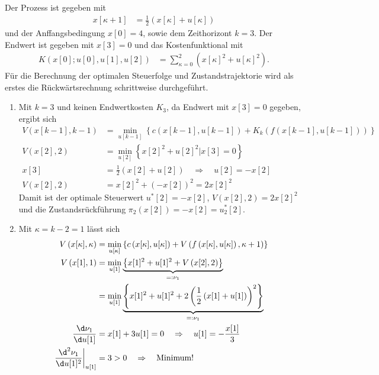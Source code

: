 \begin{exmp}\label{exmp:kap_3_zeitdis_opt_1}
Der Prozess ist gegeben mit
\begin{align*}
	x[\kappa + 1] & = \frac12\left(x[\kappa]+u[\kappa] \right)
\end{align*}
und der Anffangsbedingung $x[0]=4$, sowie dem Zeithorizont $k=3$. Der Endwert ist gegeben mit $x[3]=0$ und das Kostenfunktional mit
\begin{align}
	K\left(x[0];u[0],u[1],u[2] \right) & = \sum\limits_{\kappa=0}^2\left(x[\kappa]^2+u[\kappa]^2 \right).
\end{align}
Für die Berechnung der optimalen Steuerfolge und Zustandstrajektorie wird als erstes die Rückwärtsrechnung schrittweise durchgeführt. 
\begin{enumerate}[label=(S\arabic*)]
  \item Mit $k=3$ und keinen Endwertkosten $K_3$, da Endwert mit $x[3]=0$ gegeben, ergibt sich
\begin{align*}
	V\left(x[k-1],k-1\right) & = \min\limits_{u[k-1]}\left\{c\left(x[k-1],u[k-1]\right) + K_k\left(f(x[k-1],u[k-1]) \right) \right\}\\
	V\left(x[2],2\right) & = \min\limits_{u[2]}\left\{x[2]^2+u[2]^2\bigg| x[3]=0 \right\}\\
	x[3] & = \frac12 \left(x[2] + u[2] \right)\quad \Rightarrow\quad u[2] = -x[2]\\
	V\left(x[2],2\right) & = x[2]^2 + \left(-x[2]\right)^2 = 2x[2]^2
\end{align*}
Damit ist der optimale Steuerwert $u^{\ast}[2]=-x[2]$, $V\left(x[2],2\right)=2x[2]^2$ und die Zustandsrückführung
$\pi_2\left(x[2]\right)=-x[2]=u^{\ast}_2[2]$.
  \item Mit $\kappa=k-2=1$ lässt sich
  \begin{align*}
  	V\left(x[\kappa],\kappa\right) & = \min\limits_{u[\kappa]}\left\{c\left(x[\kappa],u[\kappa]\right)+V\left(f\left(x[\kappa],u[\kappa]
  	\right),\kappa+1 \right) \right\}\\ 
  	V\left(x[1], 1 \right) & = \min\limits_{u[1]}\underbrace{\left\{x[1]^2+u[1]^2 + V\left(x[2], 2 \right) \right\}
  	}_{=:\nu_1}\\
  	& = \min\limits_{u[1]}\underbrace{\left\{x[1]^2+u[1]^2 + 2\left(\frac12\left(x[1]+u[1] \right) \right)^2 \right\}
  	}_{=:\nu_1}\\
  	\frac{\d \nu_1}{\d u[1]} & = x[1]+3u[1]=0\quad \Rightarrow\quad u[1]=-\frac{x[1]}{3}\\
  	\left.\frac{\d^2 \nu_1}{\d u[1]^2}\right|_{u[1]} & = 3 > 0 \quad \Rightarrow\quad\text{Minimum!}\\

\end{align*}
\end{enumerate}
\end{exmp}
